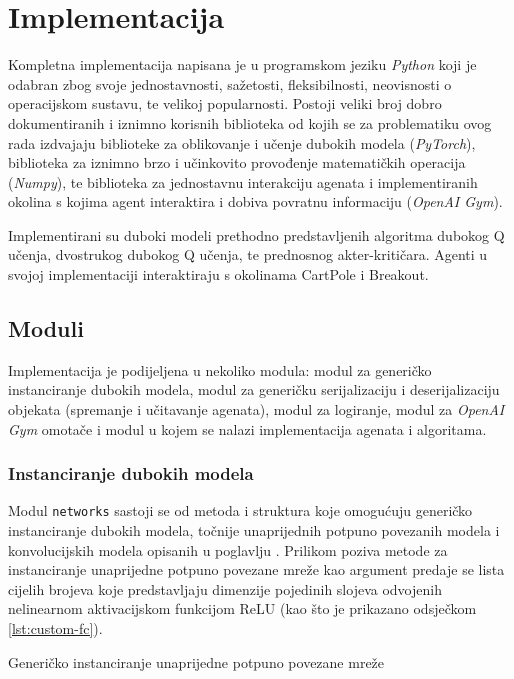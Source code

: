 \chapter{Implementacija}

Kompletna implementacija napisana je u programskom jeziku \textit{Python} koji je odabran zbog svoje jednostavnosti, sažetosti, fleksibilnosti, neovisnosti o operacijskom sustavu, te velikoj popularnosti. Postoji veliki broj dobro dokumentiranih i iznimno korisnih biblioteka od kojih se za problematiku ovog rada izdvajaju biblioteke za oblikovanje i učenje dubokih modela (\textit{PyTorch}), biblioteka za iznimno brzo i učinkovito provođenje matematičkih operacija (\textit{Numpy}), te biblioteka za jednostavnu interakciju agenata i implementiranih okolina s kojima agent interaktira i dobiva povratnu informaciju (\textit{OpenAI Gym}).

Implementirani su duboki modeli prethodno predstavljenih algoritma dubokog Q učenja, dvostrukog dubokog Q učenja, te prednosnog akter-kritičara. Agenti u svojoj implementaciji interaktiraju s okolinama CartPole i Breakout.

\section{Moduli}

Implementacija je podijeljena u nekoliko modula: modul za generičko instanciranje dubokih modela, modul za generičku serijalizaciju i deserijalizaciju objekata (spremanje i učitavanje agenata), modul za logiranje, modul za \textit{OpenAI Gym} omotače i modul u kojem se nalazi implementacija agenata i algoritama.

\subsection{Instanciranje dubokih modela}

Modul \texttt{networks} sastoji se od metoda i struktura koje omogućuju generičko instanciranje dubokih modela, točnije unaprijednih potpuno povezanih modela i konvolucijskih modela opisanih u poglavlju . Prilikom poziva metode za instanciranje unaprijedne potpuno povezane mreže kao argument predaje se lista cijelih brojeva koje predstavljaju dimenzije pojedinih slojeva odvojenih nelinearnom aktivacijskom funkcijom ReLU (kao što je prikazano odsječkom \ref{lst:custom-fc}).

\begin{listing}[H]
    \caption{Generičko instanciranje unaprijedne potpuno povezane mreže}
    \inputminted{python}{snippets/custom-fc.py}
    \label{lst:custom-fc}
\end{listing}

